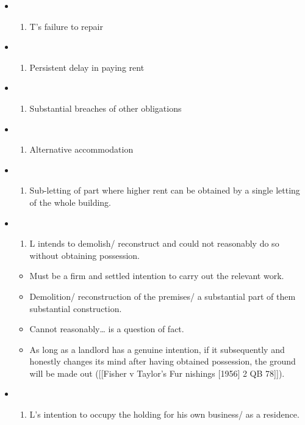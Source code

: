 \documentclass[
]{article}
\providecommand{\tightlist}{%
  \setlength{\itemsep}{0pt}\setlength{\parskip}{0pt}}
\begin{document}
\begin{itemize}
\item
  \begin{enumerate}
  \def\labelenumi{(\alph{enumi})}
  \tightlist
  \item
    T's failure to repair
  \end{enumerate}
\item
  \begin{enumerate}
  \def\labelenumi{(\alph{enumi})}
  \setcounter{enumi}{1}
  \tightlist
  \item
    Persistent delay in paying rent
  \end{enumerate}
\item
  \begin{enumerate}
  \def\labelenumi{(\alph{enumi})}
  \setcounter{enumi}{2}
  \tightlist
  \item
    Substantial breaches of other obligations
  \end{enumerate}
\item
  \begin{enumerate}
  \def\labelenumi{(\alph{enumi})}
  \setcounter{enumi}{3}
  \tightlist
  \item
    Alternative accommodation
  \end{enumerate}
\item
  \begin{enumerate}
  \def\labelenumi{(\alph{enumi})}
  \setcounter{enumi}{4}
  \tightlist
  \item
    Sub-letting of part where higher rent can be obtained by a single
    letting of the whole building.
  \end{enumerate}
\item
  \begin{enumerate}
  \def\labelenumi{(\alph{enumi})}
  \setcounter{enumi}{5}
  \tightlist
  \item
    L intends to demolish/ reconstruct and could not reasonably do so
    without obtaining possession.
  \end{enumerate}

  \begin{itemize}
  \tightlist
  \item
    Must be a firm and settled intention to carry out the relevant work.
  \item
    Demolition/ reconstruction of the premises/ a substantial part of
    them substantial construction.
  \item
    Cannot reasonably\ldots{} is a question of fact.
  \item
    As long as a landlord has a genuine intention, if it subsequently
    and honestly changes its mind after having obtained possession, the
    ground will be made out ({[}{[}Fisher v Taylor's Fur nishings
    {[}1956{]} 2 QB 78{]}{]}).
  \end{itemize}
\item
  \begin{enumerate}
  \def\labelenumi{(\alph{enumi})}
  \setcounter{enumi}{6}
  \tightlist
  \item
    L's intention to occupy the holding for his own business/ as a
    residence.
  \end{enumerate}


\end{itemize}
\end{document}
